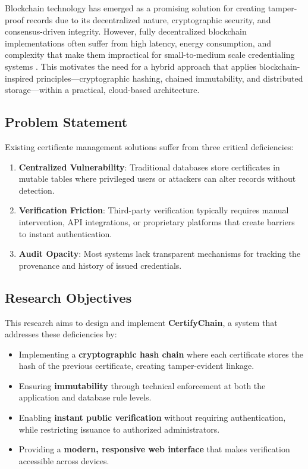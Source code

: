 \documentclass[10pt,twocolumn,a4paper]{article}
\newcommand{\certifychain}{\textbf{CertifyChain}}
\begin{document}
Blockchain technology has emerged as a promising solution for creating tamper-proof records due to its decentralized nature, cryptographic security, and consensus-driven integrity. However, fully decentralized blockchain implementations often suffer from high latency, energy consumption, and complexity that make them impractical for small-to-medium scale credentialing systems \cite{yli2016}. This motivates the need for a hybrid approach that applies blockchain-inspired principles---cryptographic hashing, chained immutability, and distributed storage---within a practical, cloud-based architecture.

\subsection{Problem Statement}

Existing certificate management solutions suffer from three critical deficiencies:

\begin{enumerate}
    \item \textbf{Centralized Vulnerability}: Traditional databases store certificates in mutable tables where privileged users or attackers can alter records without detection.
    \item \textbf{Verification Friction}: Third-party verification typically requires manual intervention, API integrations, or proprietary platforms that create barriers to instant authentication.
    \item \textbf{Audit Opacity}: Most systems lack transparent mechanisms for tracking the provenance and history of issued credentials.
\end{enumerate}

\subsection{Research Objectives}

This research aims to design and implement \certifychain{}, a system that addresses these deficiencies by:

\begin{itemize}
    \item Implementing a \textbf{cryptographic hash chain} where each certificate stores the hash of the previous certificate, creating tamper-evident linkage.
    \item Ensuring \textbf{immutability} through technical enforcement at both the application and database rule levels.
    \item Enabling \textbf{instant public verification} without requiring authentication, while restricting issuance to authorized administrators.
    \item Providing a \textbf{modern, responsive web interface} that makes verification accessible across devices.
\end{itemize}
\end{document}
